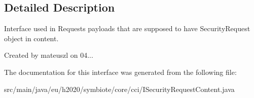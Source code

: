 \subsection{Detailed Description}
Interface used in Requests payloads that are supposed to have Security\+Request object in content.

Created by mateuszl on 04... 

The documentation for this interface was generated from the following file\+:\begin{DoxyCompactItemize}
\item 
src/main/java/eu/h2020/symbiote/core/cci/I\+Security\+Request\+Content.\+java\end{DoxyCompactItemize}
